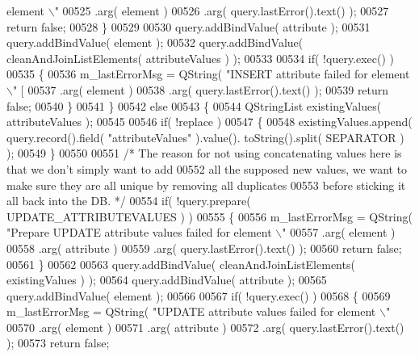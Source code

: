 \begin{DoxyCode}
{{{{{{{{{{{{{{{{{{{{{{{       element \(\backslash\)"%
00525           .arg( element )
00526           .arg( query.lastError().text() );
00527       \textcolor{keywordflow}{return} \textcolor{keyword}{false};
00528     \}
00529 
00530     query.addBindValue( attribute );
00531     query.addBindValue( element );
00532     query.addBindValue( cleanAndJoinListElements( attributeValues ) );
00533 
00534     \textcolor{keywordflow}{if}( !query.exec() )
00535     \{
00536       m\_lastErrorMsg = QString( \textcolor{stringliteral}{"INSERT attribute failed for element \(\backslash\)"%
       [%
00537           .arg( element )
00538           .arg( query.lastError().text() );
00539       \textcolor{keywordflow}{return} \textcolor{keyword}{false};
00540     \}
00541   \}
00542   \textcolor{keywordflow}{else}
00543   \{
00544     QStringList existingValues( attributeValues );
00545 
00546     \textcolor{keywordflow}{if}( !replace )
00547     \{
00548       existingValues.append( query.record().field( \textcolor{stringliteral}{"attributeValues"} ).value().
      toString().split( SEPARATOR ) );
00549     \}
00550 
00551     \textcolor{comment}{/* The reason for not using concatenating values here is that we don't
       simply want to add}
00552 \textcolor{comment}{      all the supposed new values, we want to make sure they are all unique by
       removing all duplicates}
00553 \textcolor{comment}{      before sticking it all back into the DB. */}
00554     \textcolor{keywordflow}{if}( !query.prepare( UPDATE\_ATTRIBUTEVALUES ) )
00555     \{
00556       m\_lastErrorMsg = QString( \textcolor{stringliteral}{"Prepare UPDATE attribute values failed for
       element \(\backslash\)"%
00557           .arg( element )
00558           .arg( attribute )
00559           .arg( query.lastError().text() );
00560       \textcolor{keywordflow}{return} \textcolor{keyword}{false};
00561     \}
00562 
00563     query.addBindValue( cleanAndJoinListElements( existingValues ) );
00564     query.addBindValue( attribute );
00565     query.addBindValue( element );
00566 
00567     \textcolor{keywordflow}{if}( !query.exec() )
00568     \{
00569       m\_lastErrorMsg = QString( \textcolor{stringliteral}{"UPDATE attribute values failed for element \(\backslash\)"
00570           .arg( element )
00571           .arg( attribute )
00572           .arg( query.lastError().text() );
00573       \textcolor{keywordflow}{return} \textcolor{keyword}{false};
}}}}}}}}}}}}}}}}}}}}}}}}}}
\end{DoxyCode}
